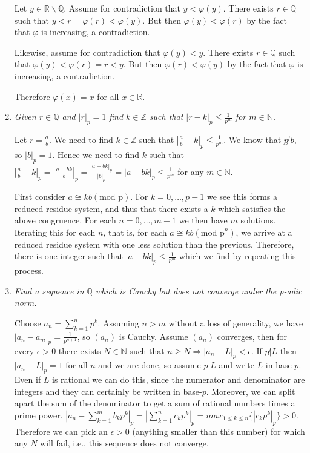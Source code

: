 \documentclass[12pt]{article}
\begin{document}
\begin{enumerate}
Let $y \in \mathbb{R} \backslash \mathbb{Q}$.  Assume for contradiction that $y<\varphi(y)$.  There exists $r \in \mathbb{Q}$ such that $y<r=\varphi(r)<\varphi(y)$.  But then $\varphi(y)<\varphi(r)$ by the fact that $\varphi$ is increasing, a contradiction.

Likewise, assume for contradiction that $\varphi(y)<y$.  There exists $r \in \mathbb{Q}$ such that $\varphi(y)<\varphi(r)=r<y$.  But then $\varphi(r)<\varphi(y)$ by the fact that $\varphi$ is increasing, a contradiction.

Therefore $\varphi(x)=x$ for all $x \in \mathbb{R}$. 
\item \emph{Given $r \in \mathbb{Q}$ and $|r|_p = 1$ find $k \in \mathbb{Z}$ such that $|r-k|_p \leq \frac{1}{p^m}$ for $m \in \mathbb{N}$.}

Let $r=\frac{a}{b}$.  We need to find $k \in \mathbb{Z}$ such that $|\frac{a}{b}-k|_p \leq \frac{1}{p^m}$.  We know that $p \not| b$, so $|b|_p=1$.  Hence we need to find $k$ such that $|\frac{a}{b}-k|_p = |\frac{a-bk}{b}|_p = \frac{|a-bk|_p}{|b|_p} = |a-bk|_p \leq \frac{1}{p^m}$ for any $m \in \mathbb{N}$.

First consider $a \cong kb (\mbox{mod p})$.  For $k=0,\ldots,p-1$ we see this forms a reduced residue system, and thus that there exists a $k$ which satisfies the above congruence.  For each $n=0,\ldots,m-1$ we then have $m$ solutions.  Iterating this for each $n$, that is, for each $a \cong kb (\mbox{mod p}^n)$, we arrive at a reduced residue system with one less solution than the previous.  Therefore, there is one integer such that $|a-bk|_p \leq \frac{1}{p^m}$ which we find by repeating this process.

\item \emph{Find a sequence in $\mathbb{Q}$ which is Cauchy but does not converge under the p-adic norm.}

Choose $a_n = \sum_{k=1}^{n}p^k$.  Assuming $n>m$ without a loss of generality, we have $|a_n - a_m|_p = \frac{1}{p^{n+1}}$, so $(a_n)$ is Cauchy.  Assume $(a_n)$ converges, then for every $\epsilon>0$ there exists $N \in \mathbb{N}$ such that $n \geq N \Rightarrow |a_n-L|_p < \epsilon$. If $p \not| L$ then $|a_n-L|_p = 1$ for all $n$ and we are done, so assume $p|L$ and write $L$ in base-$p$.  Even if $L$ is rational we can do this, since the numerator and denominator are integers and they can certainly be written in base-$p$.  Moreover, we can split apart the sum of the denominator to get a sum of rational numbers times a prime power.  $|a_n - \sum_{k=1}^mb_kp^k|_p = |\sum_{k=1}^nc_kp^k|_p = max_{1 \leq k \leq n}\{|c_kp^k|_p\} > 0$.  Therefore we can pick an $\epsilon >0$ (anything smaller than this number) for which any $N$ will fail, i.e., this sequence does not converge.



\end{enumerate}
\end{document}
